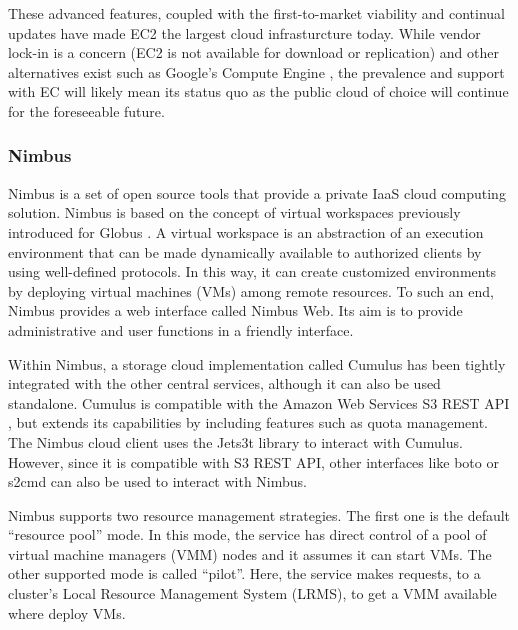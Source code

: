 These advanced features, coupled with the first-to-market viability and continual updates have made EC2 the largest cloud infrasturcture today. While vendor lock-in is a concern (EC2 is not available for download or replication) and other alternatives exist such as Google's Compute Engine \cite{krishnan2015google}, the prevalence and support with EC will likely mean its status quo as the public cloud of choice will continue for the foreseeable future.  

\subsubsection{Nimbus}

Nimbus \cite{www/nimbus,virtualwork} is a set of open source tools that provide a private IaaS cloud computing solution. Nimbus is based on the concept of virtual workspaces previously introduced for Globus \cite{virtualwork}. A virtual workspace is an abstraction of an execution environment that can be made dynamically available to authorized clients by using well-defined protocols.  In this way, it can create customized environments by deploying virtual machines (VMs) among remote resources. To such an end, Nimbus provides a web interface called Nimbus Web. Its aim is to provide administrative and user functions in a friendly interface. 

Within Nimbus, a storage cloud implementation called Cumulus \cite{www/nimbus} has been tightly integrated with the other central services, although it can also be used standalone. Cumulus is compatible with the Amazon Web Services S3 REST API \cite{www/amazons3rest}, but extends its capabilities by including features such as quota management. The Nimbus cloud client uses the Jets3t library \cite{www/jets3t} to interact with Cumulus. However, since it is compatible with S3 REST API, other interfaces like boto \cite{www/boto} or s2cmd \cite{www/s3tools} can also be used to interact with Nimbus.

Nimbus supports two resource management strategies. The first one is the default ``resource pool'' mode. In this mode, the service has direct control of a pool of virtual machine managers (VMM) nodes and it assumes it can start VMs. The other supported mode is called ``pilot''. Here, the service makes requests, to a cluster's Local Resource Management System (LRMS), to get a VMM available where deploy VMs.

